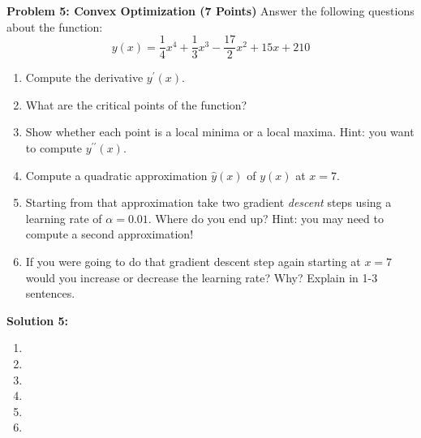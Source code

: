 \documentclass[]{article}
\begin{document}
\clearpage
\textbf{Problem 5: Convex Optimization (7 Points)}
Answer the following questions about the function:
$$y(x) = \frac{1}{4}x^4 + \frac{1}{3}x^3 - \frac{17}{2}x^2 + 15x + 210$$
\begin{enumerate}[label=(\alph*)]
    \item Compute the derivative $y^\prime(x)$.
    \item What are the critical points of the function?
    \item Show whether each point is a local minima or a local maxima. Hint: you want to compute $y^{\prime\prime}(x)$.
    \item Compute a quadratic approximation $\hat{y}(x)$ of $y(x)$ at $x = 7$.
    \item Starting from that approximation take two gradient \emph{descent} steps using a learning rate of $\alpha = 0.01$. Where do you end up? Hint: you may need to compute a second approximation!
    \item If you were going to do that gradient descent step again starting at $x = 7$ would you increase or decrease the learning rate? Why? Explain in 1-3 sentences.
\end{enumerate}

\textbf{Solution 5:}
\begin{enumerate}[label=(\alph*)]
    \item %
    \item %
    \item %
    \item %
    \item %
    \item %
\end{enumerate}
\end{document}
